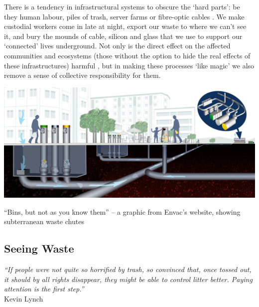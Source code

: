 \documentclass[nofonts,nols,justified,nobib]{tufte-book}
\begin{document}
There is a tendency in infrastructural systems to obscure the `hard parts': be they human labour, piles of trash, server farms or fibre-optic cables \cite{mattern_infrastructural_2013}. We make custodial workers come in late at night, export our waste to where we can't see it, and bury the mounds of cable, silicon and glass that we use to support our `connected' lives underground. Not only is the direct effect on the affected communities and ecosystems (those without the option to hide the real effects of these infrastructures) harmful \cite{liboiron_why_2014}, but in making these processes `like magic' we also remove a sense of collective responsibility for them.

\begin{marginfigure}
\includegraphics[width=\textwidth]{img/1/envac.jpg}
\caption{``Bins, but not as you know them'' -- a graphic from Envac's website, showing subterranean waste chutes \cite{envac_smart_nodate}}
\end{marginfigure}

\subsection*{Seeing Waste}

\begin{flushright}
\begin{minipage}[b]{0.8\textwidth}
\begin{flushright}
\emph{``If people were not quite so horrified by trash, so convinced that, 
once tossed out, it should by all rights disappear, they might be able to 
control litter better. Paying attention is the first step.''} \cite{lynch_wasting_1990} \\
Kevin Lynch
\end{flushright}
\end{minipage}
\end{flushright}
\end{document}
